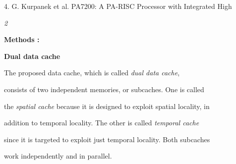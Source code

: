 \documentclass[12pt]{article}
\begin{document}
4. G. Kurpanek et al. PA7200: A PA-RISC Processor with Integrated High\par

\par 
\setlength{\parskip}{8.04pt}
{\fontsize{9pt}{10.8pt}\selectfont \textit{2}\par}\par

 {\fontsize{16pt}{19.2pt}\selectfont \textbf{Methods :}\par}\par

\begin{adjustwidth}{0.25in}{0.0in}
{\fontsize{16pt}{19.2pt}\selectfont \textbf{Dual data cache }\par}\par

\end{adjustwidth}

\setlength{\parskip}{0.0pt}
{\fontsize{10pt}{12.0pt}\selectfont The proposed data cache, which is called \textit{dual data cache},\par}\par

{\fontsize{10pt}{12.0pt}\selectfont consists of two independent memories, or subcaches. One is called\par}\par

{\fontsize{10pt}{12.0pt}\selectfont the \textit{spatial cache }because it is designed to exploit spatial locality, in\par}\par

{\fontsize{10pt}{12.0pt}\selectfont addition to temporal locality. The other is called \textit{temporal cache}\par}\par

{\fontsize{10pt}{12.0pt}\selectfont since it is targeted to exploit just temporal locality. Both subcaches\par}\par

\setlength{\parskip}{8.04pt}
\begin{adjustwidth}{0.25in}{0.0in}
{\fontsize{10pt}{12.0pt}\selectfont work independently and in parallel.\par}\par

\end{adjustwidth}
\end{document}
